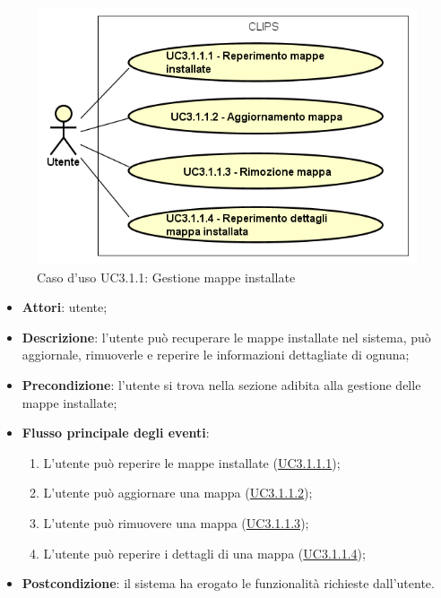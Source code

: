 \documentclass[../AnalisiDeiRequisiti.tex]{subfiles}
\begin{document}
\begin{figure}[H]
	\centering
	\includegraphics[scale=0.95, width=\textwidth]{img/UC3-1-1.png}
	\caption{Caso d'uso UC3.1.1: Gestione mappe installate}\label{fig:UC3.1.1} 
\end{figure}
\begin{itemize}
	\item \textbf{Attori}: utente;
	\item \textbf{Descrizione}: l'utente può recuperare le mappe installate nel sistema, può aggiornale, rimuoverle e reperire le informazioni dettagliate di ognuna; 
	\item \textbf{Precondizione}: l'utente si trova nella sezione adibita alla gestione delle mappe installate;
	
	\item \textbf{Flusso principale degli eventi}:
	\begin{enumerate}
		\item L'utente può reperire le mappe installate (\hyperlink{UC3.1.1.1}{UC3.1.1.1});
		\item L'utente può aggiornare una mappa (\hyperlink{UC3.1.1.2}{UC3.1.1.2});
		\item L'utente può rimuovere una mappa (\hyperlink{UC3.1.1.3}{UC3.1.1.3});
		\item L'utente può reperire i dettagli di una mappa (\hyperlink{UC3.1.1.4}{UC3.1.1.4});
		
	\end{enumerate}
	\item \textbf{Postcondizione}: il sistema ha erogato le funzionalità richieste dall'utente.
\end{itemize}
\hypertarget{UC3.1.1.1}{}
\end{document}
